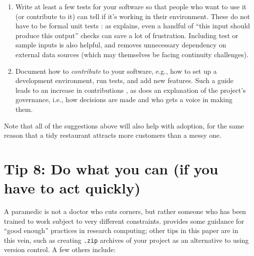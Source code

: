\documentclass[10pt,letterpaper]{article}
\begin{document}
\begin{enumerate}
\item
  Write at least a few tests for your software
  so that people who want to use it (or contribute to it)
  can tell if it's working in their environment.
  These do not have to be formal unit tests \cite{Irving2021}:
  as \cite{Taschuk2017} explains,
  even a handful of ``this input should produce this output'' checks
  can save a lot of frustration. Including test or sample inputs is also helpful, and removes unnecessary dependency on external data sources (which may themselves be facing continuity challenges).

\item
  Document how to \emph{contribute} to your software,
  e.g.,
  how to set up a development environment,
  run tests,
  and add new features.
  Such a guide leads to an increase in contributions \cite{Sholler2019},
  as does an explanation of the project's governance,
  i.e.,
  how decisions are made and who gets a voice in making them.

\end{enumerate}

Note that all of the suggestions above will also help with adoption,
for the same reason that a tidy restaurant attracts more customers than a messy one.

\section*{Tip 8: Do what you can (if you have to act quickly)}

A paramedic is not a doctor who cuts corners,
but rather someone who has been trained to work subject to very different constraints.
\cite{Wilson2017} provides some guidance for ``good enough'' practices in research computing;
other tips in this paper are in this vein,
such as creating \texttt{.zip} archives of your project as an alternative to using version control.
A few others include:
\end{document}
